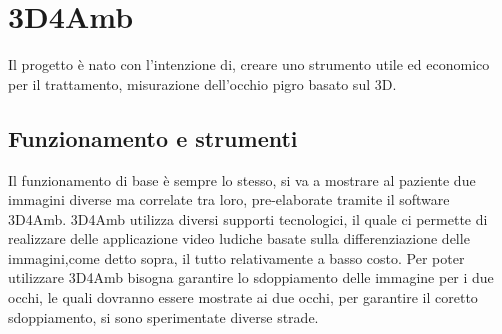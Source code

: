 \documentclass[10pt,a4paper]{article}
\begin{document}
	\section{3D4Amb}
	Il progetto è nato con l'intenzione di, creare uno strumento utile ed economico per il trattamento, misurazione dell'occhio pigro basato sul 3D.
	
	\subsection{Funzionamento e strumenti}
	Il funzionamento di base è sempre lo stesso, si va a mostrare al paziente due immagini diverse ma correlate tra loro, pre-elaborate tramite il software 3D4Amb.
	3D4Amb utilizza diversi supporti tecnologici, il quale ci permette di realizzare delle applicazione video ludiche basate sulla differenziazione delle immagini,come detto sopra, il tutto relativamente a basso costo.
	Per poter utilizzare 3D4Amb bisogna garantire lo sdoppiamento delle immagine per i due occhi, le quali dovranno essere mostrate ai due occhi, per garantire il coretto sdoppiamento, si sono sperimentate diverse strade.
\end{document}
